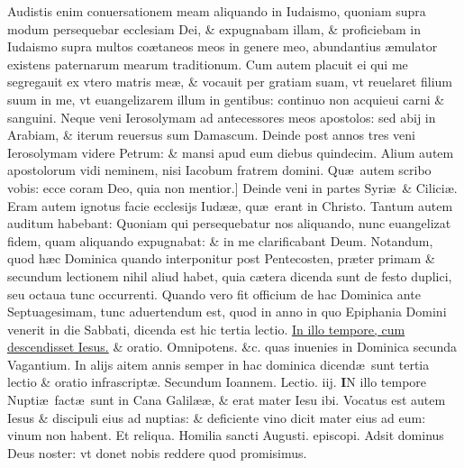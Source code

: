\documentclass[a5paper,10pt]{book}
\def\leftmarginnote{%
	\lrmarginnote{\hskip -\marginparsep \hskip -6.5em}}
\def\rightmarginnote{%
	\lrmarginnote{\hskip\columnwidth \hskip -1em}}
\def\ae{æ}
\begin{document}
\begin{multicols*}{2}
Audistis enim conuersationem meam aliquando in Iudaismo, quoniam supra modum persequebar ecclesiam Dei, \& expugnabam illam, \& proficiebam in Iudaismo supra multos co\ae taneos
meos in genere meo, abundantius \ae mulator existens paternarum mearum traditionum.
Cum autem placuit ei qui me segregauit ex vtero matris me\ae , \& vocauit per gratiam suam, vt reuelaret filium suum in me, vt euangelizarem illum in gentibus: continuo non acquieui carni \& sanguini.
Neque veni Ierosolymam ad antecessores meos apostolos: sed abij in Arabiam, \& iterum reuersus sum Damascum. Deinde post annos tres veni Ierosolymam videre Petrum: \& mansi apud eum diebus quindecim. Alium autem apostolorum vidi neminem, nisi Iacobum fratrem domini.
Qu\ae \ autem scribo vobis: ecce coram Deo, quia non mentior.]
Deinde\leftmarginnote{\begin{flushright}C\end{flushright}} veni in partes Syri\ae \ \& Cilici\ae .
Eram autem ignotus facie ecclesijs Iud\ae \ae , qu\ae \ erant in Christo. Tantum autem auditum habebant: Quoniam qui persequebatur nos aliquando, nunc euangelizat fidem, quam aliquando expugnabat: \& in me clarificabant Deum.
\newline {} \color{red} Notandum, quod h\ae c Dominica quando interponitur post Pentecosten, pr\ae ter primam \& secundum lectionem nihil aliud habet, quia c\ae tera dicenda sunt de festo duplici, seu octaua tunc occurrenti. \color{black}
\newline {} \color{red} Quando vero fit officium de hac Dominica ante Septuagesimam, tunc aduertendum est, quod in anno in quo Epiphania Domini venerit in die Sabbati, dicenda est hic tertia lectio. \color{black} \hyperlink{page.172}{In illo tempore, cum descendisset Iesus.} \color{red} \& oratio. \color{black} Omnipotens. \&c. \color{red} quas inuenies in Dominica secunda Vagantium. In alijs aitem annis semper in hac dominica dicend\ae \ sunt tertia lectio \& oratio infrascript\ae . \color{black}
\newline \color{red} Secundum Ioannem. \hfill Lectio. iij. \color{black}
\vspace{-.25em}
\lettrine[lines=2]{\bfseries \color{red} I}{}N\rightmarginnote{ca. 2.} illo tempore Nupti\ae \ fact\ae \ sunt in Cana Galil\ae \ae , \& erat mater Iesu ibi.
Vocatus est autem Iesus \& discipuli eius ad nuptias: \& deficiente vino dicit mater eius ad eum: vinum non habent.
\color{red} Et reliqua. Homilia sancti Augusti. episcopi.\color{black}
\newline \color{red} A\color{black}dsit dominus Deus noster: vt donet nobis reddere quod promisimus.

\end{multicols*}
\end{document}
